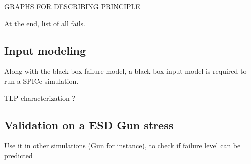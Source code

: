 GRAPHS FOR DESCRIBING PRINCIPLE

At the end, list of all fails.

\subsection{Input modeling}

Along with the black-box failure model, a black box input model is required to run a SPICe simulation.

TLP characterization ?

\subsection{Validation on a ESD Gun stress}
Use it in other simulations (Gun for instance), to check if failure level can be predicted

